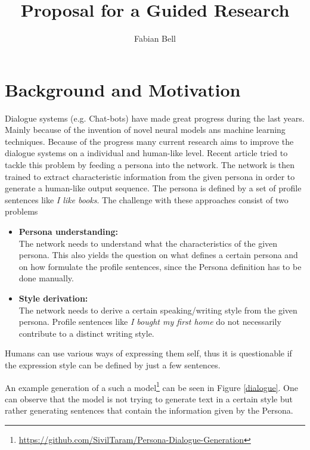 \documentclass[11pt]{article}
\title{Proposal for a Guided Research}
\author{Fabian Bell}
\date
\begin{document}
\maketitle
\section{Background and Motivation}
Dialogue systems (e.g. Chat-bots) have made great progress during the last years. Mainly because of the invention of novel neural models ans machine learning techniques. Because of the progress many current research aims to improve the dialogue systems on a individual and human-like level. Recent article \cite[]{DBLP:journals/corr/abs-1901-08149, liu2020impress} tried to tackle this problem by feeding a persona into the network. The network is then trained to extract characteristic information from the given persona in order to generate a human-like output sequence. The persona is defined by a set of profile sentences like \textit{I like books}. The challenge with these approaches consist of two problems
\begin{itemize}
\item \textbf{Persona understanding:}\\
The network needs to understand what the characteristics of the given persona. This also yields the question on what defines a certain persona and on how formulate the profile sentences, since the Persona definition has to be done manually. 
\item \textbf{Style derivation:}\\
The network needs to derive a certain speaking/writing style from the given persona. Profile sentences like \textit{I bought my first home} \cite[]{liu2020impress} do not necessarily contribute to a distinct writing style.
\end{itemize}
Humans can use various ways of expressing them self, thus it is questionable if the expression style can be defined by just a few sentences. 

An example generation of a such a model\footnote{\url{https://github.com/SivilTaram/Persona-Dialogue-Generation}} can be seen in Figure \ref{dialogue}. One can observe that the model is not trying to generate text in a certain style but rather generating sentences that contain the information given by the Persona. 
\end{document}

